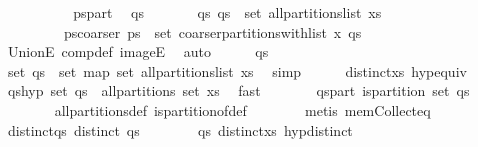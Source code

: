 \begin{isabellebody}
\isanewline
\ \ \ \ \isanewline
\isanewline
\ \ \ \ \isamarkupfalse%
\ ps{\isacharunderscore}part\ \isamarkupfalse%
\ qs\isanewline
\ \ \ \ \ \ \ qs{\isacharcolon}\ {\isachardoublequoteopen}qs\ {\isasymin}\ set\ {\isacharparenleft}all{\isacharunderscore}partitions{\isacharunderscore}list\ xs{\isacharparenright}{\isachardoublequoteclose}\isanewline
\ \ \ \ \ \ \ \ \ ps{\isacharunderscore}coarser{\isacharcolon}\ {\isachardoublequoteopen}ps\ {\isasymin}\ set\ {\isacharparenleft}coarser{\isacharunderscore}partitions{\isacharunderscore}with{\isacharunderscore}list\ x\ qs{\isacharparenright}{\isachardoublequoteclose}\isanewline
\ \ \ \ \ \ \isamarkupfalse%
\ UnionE\ comp{\isacharunderscore}def\ imageE\ \isamarkupfalse%
\ auto\isanewline
\isanewline
\ \ \ \ \isamarkupfalse%
\ qs\ \isamarkupfalse%
\ {\isachardoublequoteopen}set\ qs\ {\isasymin}\ set\ {\isacharparenleft}map\ set\ {\isacharparenleft}all{\isacharunderscore}partitions{\isacharunderscore}list\ {\isacharparenleft}xs{\isacharparenright}{\isacharparenright}{\isacharparenright}{\isachardoublequoteclose}\ \isamarkupfalse%
\ simp\isanewline
\ \ \ \ \isamarkupfalse%
\ distinct{\isacharunderscore}xs\ hyp{\isacharunderscore}equiv\ \isamarkupfalse%
\ qs{\isacharunderscore}hyp{\isacharcolon}\ {\isachardoublequoteopen}set\ qs\ {\isasymin}\ all{\isacharunderscore}partitions\ {\isacharparenleft}set\ xs{\isacharparenright}{\isachardoublequoteclose}\ \isamarkupfalse%
\ fast\isanewline
\ \ \ \ \isamarkupfalse%
\ \isamarkupfalse%
\ qs{\isacharunderscore}part{\isacharcolon}\ {\isachardoublequoteopen}is{\isacharunderscore}partition\ {\isacharparenleft}set\ qs{\isacharparenright}{\isachardoublequoteclose}\isanewline
\ \ \ \ \ \ \isamarkupfalse%
\ all{\isacharunderscore}partitions{\isacharunderscore}def\ is{\isacharunderscore}partition{\isacharunderscore}of{\isacharunderscore}def\isanewline
\ \ \ \ \ \ \isamarkupfalse%
\ {\isacharparenleft}metis\ mem{\isacharunderscore}Collect{\isacharunderscore}eq{\isacharparenright}\isanewline
\ \ \ \ \isamarkupfalse%
\ \isamarkupfalse%
\ distinct{\isacharunderscore}qs{\isacharcolon}\ {\isachardoublequoteopen}distinct\ qs{\isachardoublequoteclose}\isanewline
\ \ \ \ \ \ \isamarkupfalse%
\ qs\ distinct{\isacharunderscore}xs\ hyp{\isacharunderscore}distinct\ \isamarkupfalse%

\end{isabellebody}
